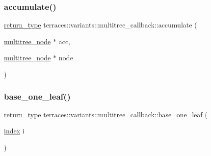 \subsubsection{\texorpdfstring{accumulate()}{accumulate()}}
{\footnotesize\ttfamily \hyperlink{classterraces_1_1variants_1_1multitree__callback_a31341dbe798daa06859cd3e0ab354bf1}{return\+\_\+type} terraces\+::variants\+::multitree\+\_\+callback\+::accumulate (\begin{DoxyParamCaption}\item[{\hyperlink{structterraces_1_1multitree__node}{multitree\+\_\+node} $\ast$}]{acc,  }\item[{\hyperlink{structterraces_1_1multitree__node}{multitree\+\_\+node} $\ast$}]{node }\end{DoxyParamCaption})\hspace{0.3cm}{\ttfamily [inline]}}

\mbox{\label{classterraces_1_1variants_1_1multitree__callback_ae91d72a91413b048a2cc8cbe58732bdf}} 
\subsubsection{\texorpdfstring{base\+\_\+one\+\_\+leaf()}{base\_one\_leaf()}}
{\footnotesize\ttfamily \hyperlink{classterraces_1_1variants_1_1multitree__callback_a31341dbe798daa06859cd3e0ab354bf1}{return\+\_\+type} terraces\+::variants\+::multitree\+\_\+callback\+::base\+\_\+one\+\_\+leaf (\begin{DoxyParamCaption}\item[{\hyperlink{namespaceterraces_adbc33ccb543d1634e96d0eb02e472c77}{index}}]{i }\end{DoxyParamCaption})\hspace{0.3cm}{\ttfamily [inline]}}

\mbox{\label{classterraces_1_1variants_1_1multitree__callback_ab6cabd831c1154159acaeb0ba8e96302}} 
